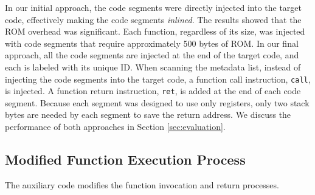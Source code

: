 In our initial approach, the code segments were directly injected into the target code, effectively making the code segments \textit{inlined}. The results showed that the ROM overhead was significant. Each function, regardless of its size, was injected with code segments that require approximately 500 bytes of ROM. In our final approach, all the code segments are injected at the end of the target code, and each is labeled with its unique ID. When scanning the metadata list, instead of injecting the code segments into the target code, a function call instruction, \texttt{call}, is injected. A function return instruction, \texttt{ret}, is added at the end of each code segment. Because each segment was designed to use only registers, only two stack bytes are needed by each segment to save the return address. We discuss the performance of both approaches in Section \ref{sec:evaluation}.
\subsection{Modified Function Execution Process}
The auxiliary code modifies the function invocation and return processes.

